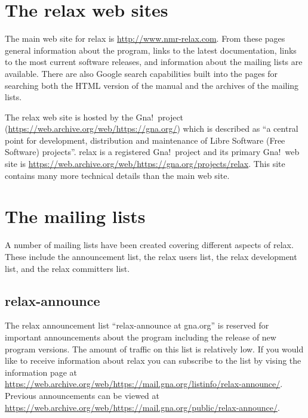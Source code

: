 
\section{The relax web sites}

The main web site for relax is \href{http://www.nmr-relax.com}{http://www.nmr-relax.com}.
From these pages general information about the program, links to the latest documentation, links to the most current software releases, and information about the mailing lists are available.
There are also Google search capabilities built into the pages for searching both the HTML version of the manual and the archives of the mailing lists.

The relax web site is hosted by the Gna!\ project (\href{https://web.archive.org/web/https://gna.org/}{https://web.archive.org/web/https://gna.org/}) which is described as ``a central point for development, distribution and maintenance of Libre Software (Free Software) projects''.
relax is a registered Gna!\ project and its primary Gna!\ web site is \href{https://web.archive.org/web/https://gna.org/projects/relax}{https://web.archive.org/web/https://gna.org/projects/relax}.
This site contains many more technical details than the main web site.




\section{The mailing lists}

A number of mailing lists have been created covering different aspects of relax.
These include the announcement list, the relax users list, the relax development list, and the relax committers list.


\subsection{relax-announce}

The relax announcement list ``relax-announce at gna.org'' is reserved for important announcements about the program including the release of new program versions.
The amount of traffic on this list is relatively low.
If you would like to receive information about relax you can subscribe to the list by vising the information page at \href{https://web.archive.org/web/https://mail.gna.org/listinfo/relax-announce/}{https://web.archive.org/web/https://mail.gna.org/listinfo/relax-announce/}.
Previous announcements can be viewed at \href{https://web.archive.org/web/https://mail.gna.org/public/relax-announce/}{https://web.archive.org/web/https://mail.gna.org/public/relax-announce/}.



